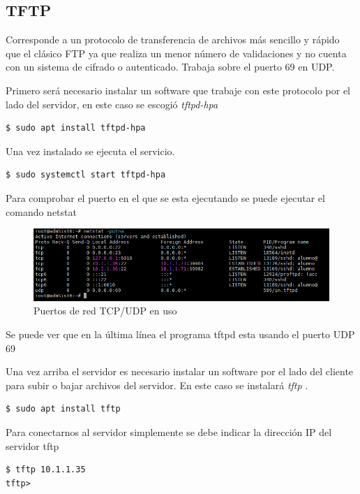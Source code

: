 \documentclass[12pt]{article}
\begin{document}
\subsection{TFTP}

Corresponde a un protocolo de transferencia de archivos más sencillo y rápido que el clásico FTP ya que realiza un menor número de validaciones y no cuenta con un sistema de cifrado o autenticado. Trabaja sobre el puerto 69 en UDP.\cite{tftp}

Primero será necesario instalar un software que trabaje con este protocolo por el lado del servidor, en este caso se escogió \emph{tftpd-hpa}

\begin{lstlisting}[frame=single]
$ sudo apt install tftpd-hpa
\end{lstlisting}

Una vez instalado se ejecuta el servicio.
\begin{lstlisting}[frame=single]
$ sudo systemctl start tftpd-hpa
\end{lstlisting}

Para comprobar el puerto en el que se esta ejecutando se puede ejecutar el comando netstat

\begin{figure}[!h]
   \centering
   \includegraphics[scale=.69]{imgs/netstat1.png}
   \caption{Puertos de red TCP/UDP en uso}
   \label{fig7}
\end{figure}
Se puede ver que en la última línea el programa tftpd esta usando el puerto UDP 69

Una vez arriba el servidor es necesario instalar un software por el lado del cliente para subir o bajar archivos del servidor. En este caso se instalará  \emph{tftp} .

\begin{lstlisting}[frame=single]
$ sudo apt install tftp
\end{lstlisting}

Para conectarnos al servidor simplemente se debe indicar la dirección IP del servidor tftp
\begin{lstlisting}[frame=single]
$ tftp 10.1.1.35
tftp>
\end{lstlisting}
\end{document}

